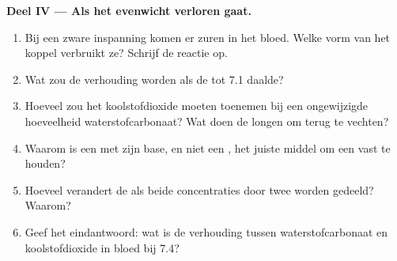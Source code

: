 \begin{problem}
\medskip
\noindent\textbf{Deel IV --- Als het evenwicht verloren gaat.}
\begin{enumerate}[resume]
  \item Bij een zware inspanning komen er zuren in het bloed. Welke vorm
        van het koppel verbruikt ze? Schrijf de reactie op.
  \item Wat zou de verhouding worden als de  tot 7.1 daalde?
  \item Hoeveel zou het koolstofdioxide moeten toenemen bij een
        ongewijzigde hoeveelheid waterstofcarbonaat? Wat doen de longen om
        terug te vechten?
  \item Waarom is een  met zijn base, en niet een , het
        juiste middel om een  vast te houden?
  \item Hoeveel verandert de  als beide concentraties door twee worden
        gedeeld? Waarom?
  \item Geef het eindantwoord: wat is de verhouding tussen
        waterstofcarbonaat en koolstofdioxide in bloed bij  7.4?
\end{enumerate}
\end{problem}

